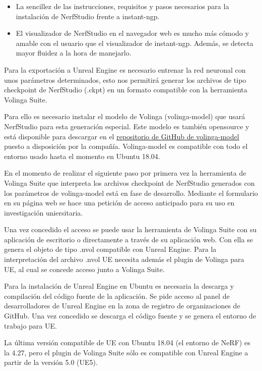 \documentclass[a4paper, 12pt, spanish, twoside]{article}
\begin{document}
\begin{itemize} 

\item La sencillez de las instrucciones, requisitos y pasos necesarios para la instalación de NerfStudio frente a instant-ngp. 

\item El visualizador de NerfStudio en el navegador web es mucho más cómodo y amable con el usuario que el visualizador de instant-ngp. Además, se detecta mayor fluidez a la hora de manejarlo. 

\end{itemize} 

Para la exportación a Unreal Engine es necesario entrenar la red neuronal con unos parámetros determinados, esto nos permitirá generar los archivos de tipo checkpoint de NerfStudio (.ckpt) en un formato compatible con la herramienta Volinga Suite. 

Para ello es necesario instalar el modelo de Volinga (volinga-model) que usará NerfStudio para esta generación especial. Este modelo es también opensource y está disponible para descargar en el \href{https://github.com/Volinga/volinga-model}{repositorio de GitHub de volinga-model} puesto a disposición por la compañía. Volinga-model es compatible con todo el entorno usado hasta el momento en Ubuntu 18.04. 

En el momento de realizar el siguiente paso por primera vez la herramienta de Volinga Suite que interpreta los archivos checkpoint de NerfStudio generados con los parámetros de volinga-model está en fase de desarrollo. Mediante el formulario en su página web se hace una petición de acceso anticipado para su uso en investigación uniersitaria.  

Una vez concedido el acceso se puede usar la herramienta de Volinga Suite con su aplicación de escritorio o directamente a través de su aplicación web. Con ella se genera el objeto de tipo .nvol compatible con Unreal Engine. Para la interpretación del archivo .nvol UE necesita además el plugin de Volinga para UE, al cual se concede acceso junto a Volinga Suite. 

Para la instalación de Unreal Engine en Ubuntu es necesaria la descarga y compilación del código fuente de la aplicación. Se pide acceso al panel de desarrolladores de Unreal Engine en la zona de registro de organizaciones de GitHub. Una vez concedido se descarga el código fuente y se genera el entorno de trabajo para UE. 

La última versión compatible de UE con Ubuntu 18.04 (el entorno de NeRF) es la 4.27, pero el plugin de Volinga Suite sólo es compatible con Unreal Engine a partir de la versión 5.0 (UE5). 
\end{document}
